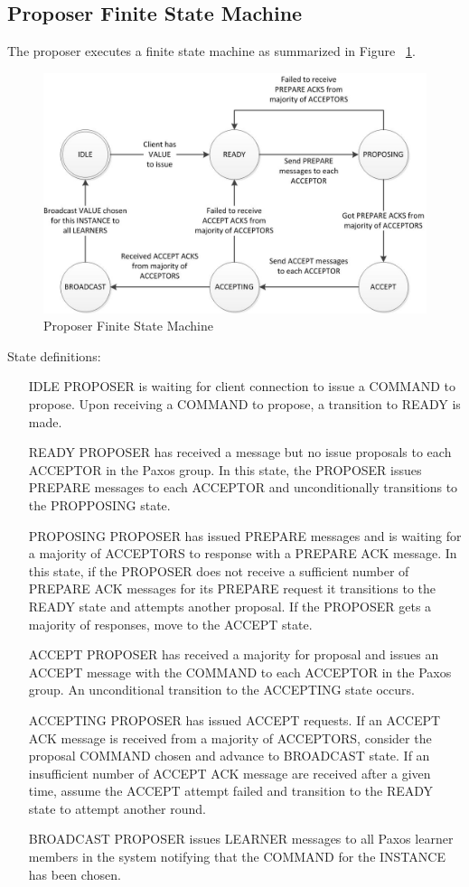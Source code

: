 \documentclass{article}
\begin{document}
\subsection{Proposer Finite State Machine}

The proposer executes a finite state machine as summarized in Figure ~\ref{proposer_fsm}.

\begin{figure}
\centering
\includegraphics[width=6in]{proposer_fsm.jpg}
\caption{Proposer Finite State Machine}
\label{proposer_fsm}
\end{figure}

State definitions:
\begin{itemize}
\item[IDLE] PROPOSER is waiting for client connection to issue a COMMAND to propose. 
  Upon receiving a COMMAND to propose, a transition to READY is made.
\item[READY] PROPOSER has received a message but no issue proposals to each ACCEPTOR in the Paxos group.
  In this state, the PROPOSER issues PREPARE messages to each ACCEPTOR and unconditionally transitions to the PROPPOSING state.
\item[PROPOSING] PROPOSER has issued PREPARE messages and is waiting for a majority of ACCEPTORS to response with a PREPARE ACK message.
  In this state, if the PROPOSER does not receive a sufficient number of PREPARE ACK messages for its PREPARE request it transitions to the READY state and attempts another proposal.
  If the PROPOSER gets a majority of responses, move to the ACCEPT state.
\item[ACCEPT] PROPOSER has received a majority for proposal and issues an ACCEPT message with the COMMAND to each ACCEPTOR in the Paxos group. 
  An unconditional transition to the ACCEPTING state occurs.
\item[ACCEPTING] PROPOSER has issued ACCEPT requests. 
  If an ACCEPT ACK message is received from a majority of ACCEPTORS, consider the proposal COMMAND chosen and advance to BROADCAST state.
 If an insufficient number of ACCEPT ACK message are received after a given time, assume the ACCEPT attempt failed and transition to the READY state to attempt another round. 
\item[BROADCAST] PROPOSER issues LEARNER messages to all Paxos learner members in the system notifying that the COMMAND for the INSTANCE has been chosen.
\end{itemize}
\end{document}
